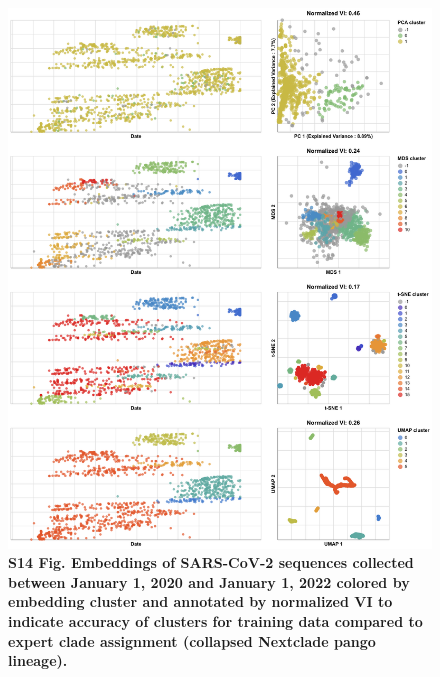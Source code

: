 \documentclass[10pt,letterpaper]{article}
\begin{document}
\begin{figure}[!h]
\includegraphics[width=\columnwidth]{figures/sarscov2-embeddings-by-cluster-vs-Nextclade_pango_collapsed.png}
\caption*{{\bf S14 Fig. Embeddings of SARS-CoV-2 sequences collected between January 1, 2020 and January 1, 2022 colored by embedding cluster and annotated by normalized VI to indicate accuracy of clusters for training data compared to expert clade assignment (collapsed Nextclade pango lineage).}}
\end{figure}
\end{document}
